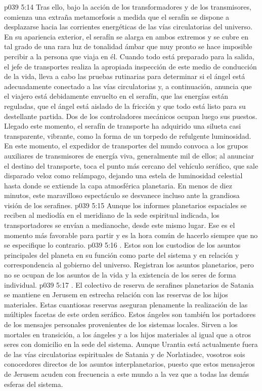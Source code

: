 \vs p039 5:14 Tras ello, bajo la acción de los transformadores y de los transmisores, comienza una extraña metamorfosis a medida que el serafín se dispone a desplazarse hacia las corrientes energéticas de las vías circulatorias del universo. En su apariencia exterior, el serafín se alarga en ambos extremos y se cubre en tal grado de una rara luz de tonalidad ámbar que muy pronto se hace imposible percibir a la persona que viaja en él. Cuando todo está preparado para la salida, el jefe de transportes realiza la apropiada inspección de este medio de conducción de la vida, lleva a cabo las pruebas rutinarias para determinar si el ángel está adecuadamente conectado a las vías circulatorias y, a continuación, anuncia que el viajero está debidamente envuelto en el serafín, que las energías están reguladas, que el ángel está aislado de la fricción y que todo está listo para su destellante partida. Dos de los controladores mecánicos ocupan luego sus puestos. Llegado este momento, el serafín de transporte ha adquirido una silueta casi transparente, vibrante, como la forma de un torpedo de refulgente luminosidad. En este momento, el expedidor de transportes del mundo convoca a los grupos auxiliares de transmisores de energía viva, generalmente mil de ellos; al anunciar el destino del transporte, toca el punto más cercano del vehículo seráfico, que sale disparado veloz como relámpago, dejando una estela de luminosidad celestial hasta donde se extiende la capa atmosférica planetaria. En menos de diez minutos, este maravilloso espectáculo se desvanece incluso ante la grandiosa visión de los serafines.
\vs p039 5:15 \pc Aunque los informes planetarios espaciales se reciben al mediodía en el meridiano de la sede espiritual indicada, los transportadores se envían a medianoche, desde este mismo lugar. Ese es el momento más favorable para partir y es la hora común de hacerlo siempre que no se especifique lo contrario.
\vs p039 5:16 . Estos son los custodios de los asuntos principales del planeta en su función como parte del sistema y en relación y correspondencia al gobierno del universo. Registran los asuntos planetarios, pero no se ocupan de los asuntos de la vida y la existencia de los seres de forma individual.
\vs p039 5:17 . El colectivo de reserva de serafines planetarios de Satania se mantiene en Jerusem en estrecha relación con las reservas de los hijos materiales. Estas cuantiosas reservas aseguran plenamente la realización de las múltiples facetas de este orden seráfico. Estos ángeles son también los portadores de los mensajes personales provenientes de los sistemas locales. Sirven a los mortales en transición, a los ángeles y a los hijos materiales al igual que a otros seres con domicilio en la sede del sistema. Aunque Urantia está actualmente fuera de las vías circulatorias espirituales de Satania y de Norlatiadec, vosotros sois conocedores directos de los asuntos interplanetarios, puesto que estos mensajeros de Jerusem acuden con frecuencia a este mundo a la vez que a todas las demás esferas del sistema.
